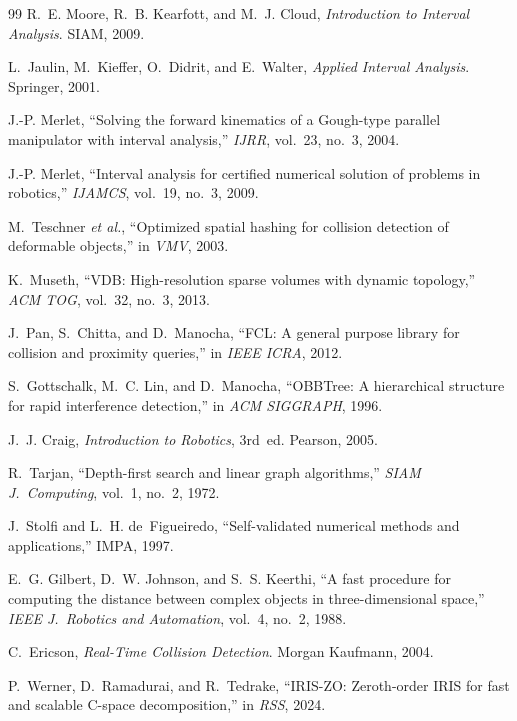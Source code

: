 \documentclass[journal]{IEEEtran}
\newcommand{\etal}{\textit{et al.}}
\begin{document}
\begin{thebibliography}{99}
R.~E. Moore, R.~B. Kearfott, and M.~J. Cloud, \emph{Introduction to Interval Analysis}. SIAM, 2009.

L.~Jaulin, M.~Kieffer, O.~Didrit, and E.~Walter, \emph{Applied Interval Analysis}. Springer, 2001.

J.-P. Merlet, ``Solving the forward kinematics of a Gough-type parallel manipulator with interval analysis,'' \emph{IJRR}, vol.~23, no.~3, 2004.

J.-P. Merlet, ``Interval analysis for certified numerical solution of problems in robotics,'' \emph{IJAMCS}, vol.~19, no.~3, 2009.

M.~Teschner \etal, ``Optimized spatial hashing for collision detection of deformable objects,'' in \emph{VMV}, 2003.

K.~Museth, ``VDB: High-resolution sparse volumes with dynamic topology,'' \emph{ACM TOG}, vol.~32, no.~3, 2013.

J.~Pan, S.~Chitta, and D.~Manocha, ``FCL: A general purpose library for collision and proximity queries,'' in \emph{IEEE ICRA}, 2012.

S.~Gottschalk, M.~C. Lin, and D.~Manocha, ``OBBTree: A hierarchical structure for rapid interference detection,'' in \emph{ACM SIGGRAPH}, 1996.

J.~J. Craig, \emph{Introduction to Robotics}, 3rd~ed. Pearson, 2005.

R.~Tarjan, ``Depth-first search and linear graph algorithms,'' \emph{SIAM J.\ Computing}, vol.~1, no.~2, 1972.

J.~Stolfi and L.~H. de~Figueiredo, ``Self-validated numerical methods and applications,'' IMPA, 1997.

E.~G. Gilbert, D.~W. Johnson, and S.~S. Keerthi, ``A fast procedure for computing the distance between complex objects in three-dimensional space,'' \emph{IEEE J.\ Robotics and Automation}, vol.~4, no.~2, 1988.

C.~Ericson, \emph{Real-Time Collision Detection}. Morgan Kaufmann, 2004.

P.~Werner, D.~Ramadurai, and R.~Tedrake, ``IRIS-ZO: Zeroth-order IRIS for fast and scalable C-space decomposition,'' in \emph{RSS}, 2024.


\end{thebibliography}
\end{document}
